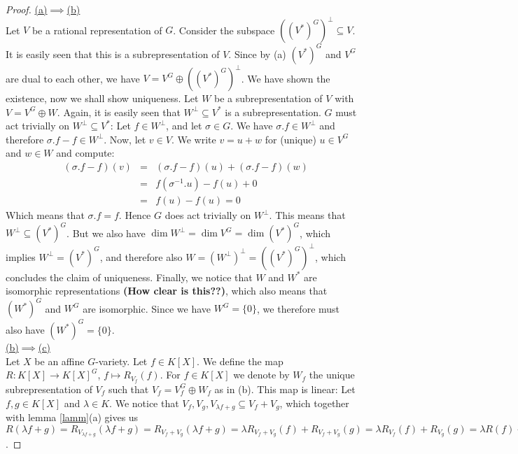 \begin{proof}
  \hfill \break
  \underline{(a)$\implies$(b)}\\
  Let $V$ be a rational representation of $G$.
  Consider the subspace $ ((V^\ast)^G)^\bot \subseteq V $.
  It is easily seen that this is a subrepresentation of $V$.
  Since by (a) $(V^\ast)^G$ and $V^G$ are dual to each other, we have $V = V^G \oplus ((V^\ast)^G)^\bot $.
  We have shown the existence, now we shall show uniqueness.
  Let $W$ be a subrepresentation of $V$ with $V = V^G \oplus W $.
  Again, it is easily seen that $W^\bot \subseteq V^\ast$ is a subrepresentation.
  $G$ must act trivially on $W^\bot \subseteq V^\ast$:
  Let $f \in W^\bot$, and let $\sigma \in G$.
  We have $\sigma.f \in W^\bot$ and therefore $\sigma.f - f \in W^\bot$.
  Now, let $v \in V$.
  We write $v = u + w$ for (unique) $u \in V^G$ and $w \in W$ and compute:
  \begin{equation}
    \begin{aligned}
      &(\sigma.f -f)(v)&=&(\sigma.f -f)(u) + (\sigma.f -f)(w)\\
      &&=&f(\sigma^{-1}.u) - f(u) + 0\\
      &&=&f(u)-f(u) = 0
    \end{aligned}
  \end{equation}
  Which means that $\sigma.f = f$.
  Hence $G$ does act trivially on $W^\bot$.
  This means that $W^\bot \subseteq (V^\ast)^G$.
  But we also have $\operatorname{dim}W^\bot = \operatorname{dim}V^G = \operatorname{dim}(V^\ast)^G$, which implies $W^\bot = (V^\ast)^G$, and therefore also $W = (W^\bot)^\bot = ((V^\ast)^G)^\bot$, which concludes the claim of uniqueness.
  Finally, we notice that $W$ and $W^\ast$ are isomorphic representations \textbf{(How clear is this??)}, which also means that $(W^\ast)^G$ and $W^G$ are isomorphic.
  Since we have $W^G = \{0\}$, we therefore must also have $(W^\ast)^G = \{0\}$.\\
  \underline{(b)$\implies$(c)}\\
  Let $X$ be an affine $G$-variety.
  Let $f \in K[X]$.
  We define the map $R \colon K[X] \longrightarrow K[X]^G $, $ f \mapsto R_{V_f}(f)$.
  For $f \in K[X]$ we denote by $W_f$ the unique subrepresentation of $V_f$ such that $V_f = V_f^G \oplus W_f$ as in (b).
  This map is linear:
  Let $f,g \in K[X]$ and $\lambda \in K$.
  We notice that $V_f,V_g,V_{\lambda f + g} \subseteq V_f + V_g$, which together with lemma \ref{lamm}(a) gives us $R(\lambda f +g) = R_{V_{\lambda f +g}}(\lambda f+g) = R_{V_f +V_g}(\lambda f+g) = \lambda R_{V_f + V_g} (f) + R_{V_f + V_g}(g) = \lambda R_{V_f} (f) + R_{V_g}(g) = \lambda R(f) + R(g)$.

\end{proof}
